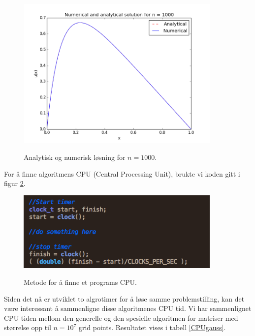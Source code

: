 \documentclass{article}
\begin{document}
\FloatBarrier
\begin{figure}[!ht]
  \begin{center}
  \includegraphics[width = 100mm]{b_n1000.png}\\
  \caption{Analytisk og numerisk løsning for $n=1000$.}\label{fig:n1000}
  \end{center}
\end{figure}
\FloatBarrier

For å finne algoritmens CPU (Central Processing Unit), brukte vi koden gitt i figur \ref{fig:CPU}.

\FloatBarrier
\begin{figure}[!ht]
  \begin{center}
  \includegraphics[width = 100mm]{timer.png}\\
  \caption{Metode for å finne et programs CPU.}\label{fig:CPU}
  \end{center}
\end{figure}
\FloatBarrier

Siden det nå er utviklet to algrotimer for å løse samme problemstilling, kan det være interessant å sammenligne disse algoritmenes CPU tid. Vi har sammenlignet CPU tiden mellom den generelle og den spesielle algoritmen for matriser med størrelse opp til $n=10^7$ grid points. Resultatet vises i tabell \ref{CPUgauss}.
\end{document}
